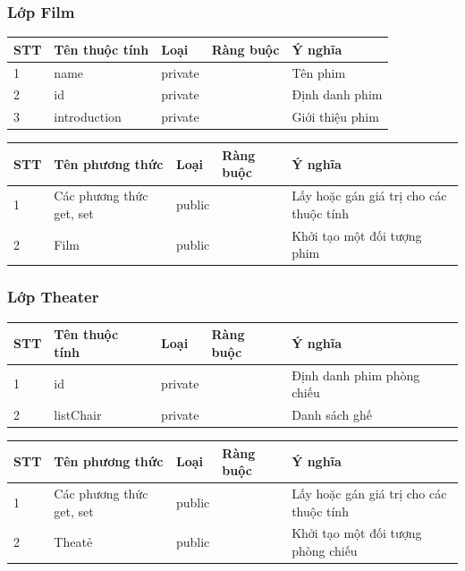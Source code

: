 \documentclass[a4paper, 12pt]{article}
\begin{document}
\subsubsection{Lớp Film}
\begin{table}[H]
\centering
\begin{tabular}{|l|l|l|l|l|}
\hline
STT & Tên thuộc tính & Loại    & Ràng buộc & Ý nghĩa                	\\ \hline
1   & name           & private &           & Tên phim 					\\ \hline
2   & id             & private &           & Định danh phim           	\\ \hline
3   & introduction   & private &           & Giới thiệu phim          	\\ \hline
\end{tabular}
\end{table}
\begin{table}[H]
\centering
\begin{tabular}{|l|l|l|l|l|}
\hline
STT & Tên phương thức          & Loại   & Ràng buộc & Ý nghĩa                                 \\ \hline
1   & Các phương thức get, set & public &           & Lấy hoặc gán giá trị cho các thuộc tính \\ \hline
2   & Film                     & public &           & Khởi tạo một đối tượng phim             \\ \hline
\end{tabular}
\end{table}

\subsubsection{Lớp Theater}
\begin{table}[H]
\centering
\begin{tabular}{|l|l|l|l|l|}
\hline
STT & Tên thuộc tính & Loại    & Ràng buộc & Ý nghĩa                    \\ \hline
1   & id           	 & private &           & Định danh phim phòng chiếu \\ \hline
2   & listChair      & private &           & Danh sách ghế              \\ \hline
\end{tabular}
\end{table}
\begin{table}[H]
\centering
\begin{tabular}{|l|l|l|l|l|}
\hline
STT & Tên phương thức          & Loại   & Ràng buộc & Ý nghĩa                                 \\ \hline
1   & Các phương thức get, set & public &           & Lấy hoặc gán giá trị cho các thuộc tính \\ \hline
2   & Theatẻ                   & public &           & Khởi tạo một đối tượng phòng chiếu      \\ \hline
\end{tabular}
\end{table}
\end{document}
